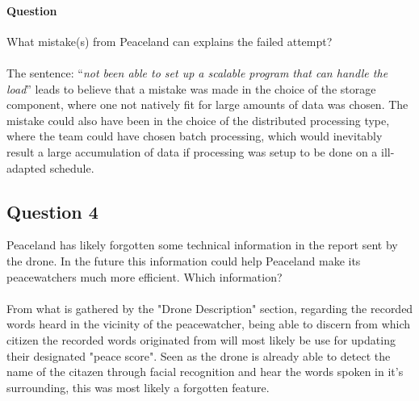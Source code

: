 \documentclass[11pt]{article}
\begin{document}
\paragraph{Question} What mistake(s) from Peaceland can explains the failed
attempt?\\\\
The sentence: ``\textit{not been able to set up a scalable program that can
  handle the load}'' leads to believe that a mistake was made in the choice of
the storage component, where one not natively fit for large amounts of data was
chosen. The mistake could also have been in the choice of the distributed
processing type, where the team could have chosen batch processing, which would
inevitably result a large accumulation of data if processing was setup to be
done on a ill-adapted schedule.
\subsection{Question 4} Peaceland has likely forgotten some technical
information in the report sent by the drone. In the future this information
could help Peaceland make its peacewatchers much more efficient. Which
information?\\\\ From what is gathered by the "Drone Description" section,
regarding the recorded words heard in the vicinity of the peacewatcher, being
able to discern from which citizen the recorded words originated from will most
likely be use for updating their designated "peace score". Seen as the drone is
already able to detect the name of the citazen through facial recognition and
hear the words spoken in it's surrounding, this was most likely a forgotten
feature.
\end{document}
